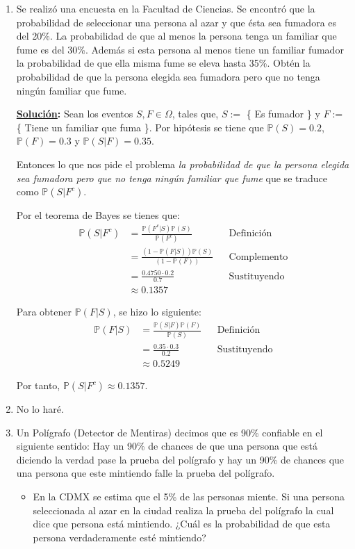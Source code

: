 \documentclass[11pt,letterpaper]{report}
\newcommand{\Pro}{\mathds{P}}
\newcommand{\sol}{\textbf{\underline{Solución}: }} %
\begin{document}
\begin{enumerate}
\item Se realizó una encuesta en la Facultad de Ciencias. Se encontró que la probabilidad de
seleccionar una persona al azar y que ésta sea fumadora es del 20\%. La probabilidad de que al
menos la persona tenga un familiar que fume es del 30\%. Además si esta persona al menos tiene un
familiar fumador la probabilidad de que ella misma fume se eleva hasta 35\%. Obtén la probabilidad
de que la persona elegida sea fumadora pero que no tenga ningún familiar que fume.

\sol Sean los eventos $S, F \in \Omega$, tales que, $S := $ \{ Es fumador \} y
$F := $ \{ Tiene un familiar que fuma \}. Por hipótesis se tiene que $\Pro(S) = 0.2$,
$\Pro(F) = 0.3$ y $\Pro(S | F) = 0.35$.

Entonces lo que nos pide el problema \emph{la probabilidad de que la persona elegida sea
fumadora pero que no tenga ningún familiar que fume} que se traduce como $\Pro(S | F^c)$.

Por el teorema de Bayes se tienes que:
\begin{align*}
    \Pro(S | F^c)
        &= \frac{\Pro(F^c | S) \Pro(S)}{\Pro(F^c)} && \text{Definición}\\
        &= \frac{(1 - \Pro(F | S)) \Pro(S)}{(1 - \Pro(F))} && \text{Complemento}\\
        &= \frac{0.4750 \cdot 0.2}{0.7} && \text{Sustituyendo}\\
        &\approx 0.1357
\end{align*}

Para obtener $\Pro(F | S)$, se hizo lo siguiente:
\begin{align*}
    \Pro(F | S)
        &= \frac{\Pro(S | F)\Pro(F)}{\Pro(S)} && \text{Definición}\\
        &= \frac{0.35 \cdot 0.3}{0.2} && \text{Sustituyendo}\\
        &\approx 0.5249
\end{align*}

Por tanto, $\Pro(S | F^c) \approx 0.1357$.

\item No lo haré.

\item  Un Polígrafo (Detector de Mentiras) decimos que es 90\% confiable en el siguiente sentido: Hay
un 90\% de chances de que una persona que está diciendo la verdad pase la prueba del polígrafo y
hay un 90\% de chances que una persona que este mintiendo falle la prueba del polígrafo.
\begin{itemize}
    \item En la CDMX se estima que el 5\% de las personas miente. Si una persona seleccionada al
    azar en la ciudad realiza la prueba del polígrafo la cual dice que persona está mintiendo.
    ¿Cuál es la probabilidad de que esta persona verdaderamente esté mintiendo?
    

\end{itemize}
\end{enumerate}
\end{document}

